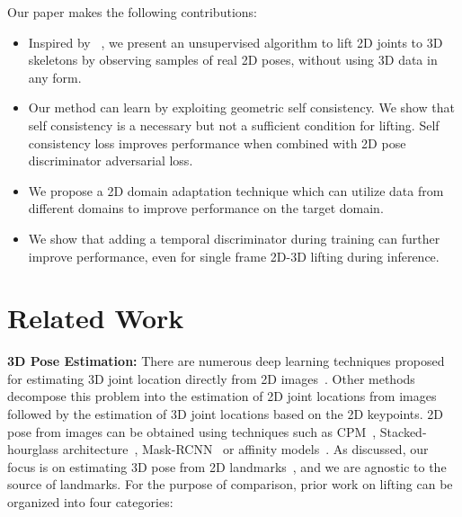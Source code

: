 \documentclass[10pt,twocolumn,letterpaper]{article}
\begin{document}
Our paper makes the following contributions:
\vspace{-2ex}
\begin{itemize}
	\setlength{\itemsep}{0pt}
	\setlength{\leftmargin}{0in}
	\item Inspired by ~\cite{ZedNet_2018_ECCVW}, we present an unsupervised algorithm to lift 2D joints to 3D skeletons by observing samples of real 2D poses, without using 3D data in any form.
\item Our method can learn by exploiting geometric self consistency. We show that self consistency is a necessary but not a sufficient condition for lifting. Self consistency loss improves performance when combined with 2D pose discriminator adversarial loss.
	\item We propose a 2D domain adaptation technique which can utilize data from different domains to improve performance on the target domain.
	\item We show that adding a temporal discriminator during training can further improve performance, even for single frame 2D-3D lifting during inference.
\end{itemize}





































 
\section{Related Work}
\label{sect:related_work}


\textbf{3D Pose Estimation:} There are numerous deep learning techniques proposed for estimating 3D joint location directly from 2D images~\cite{orinet,mono-3dhp2017,park20163d,conf/bmvc/ParkK18,Pavlakos_2017_CVPR,Rogez_2017_CVPR}. Other methods decompose this problem into the estimation of 2D joint locations from images followed by the estimation of 3D joint locations based on the 2D keypoints. 2D pose from images can be obtained using techniques such as CPM~\cite{cpm}, Stacked-hourglass architecture~\cite{stacked-hourglass}, Mask-RCNN~\cite{mask-rcnn} or affinity models~\cite{OpenPose}. As discussed, our focus is on estimating 3D pose from 2D landmarks~\cite{ChenDeva2017,Tung_2017_ICCV,MartinezICCV2017}, and we are agnostic to the source of landmarks.
For the purpose of comparison, prior work on lifting can be organized into four categories:
\end{document}
